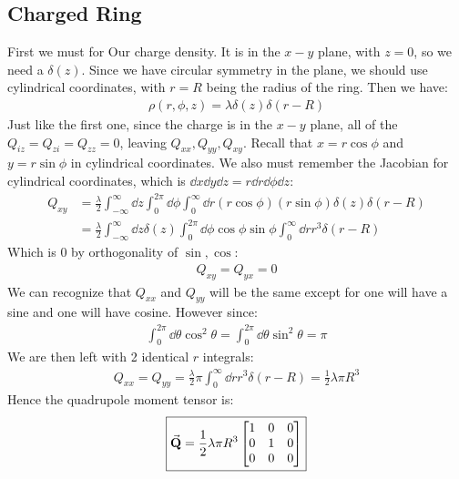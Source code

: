 \documentclass[12pt]{article}
\begin{document}
\subsection{Charged Ring}
First we must for Our charge density. It is in the $x-y$ plane, with $z=0$, so we need a $\delta(z)$. Since we have circular symmetry in the plane, we should use cylindrical coordinates, with $r=R$ being the radius of the ring. Then we have:
\begin{align*}
  \rho(r,\phi,z)=\lambda\delta(z)\delta(r-R)
\end{align*}
Just like the first one, since the charge is in the $x-y$ plane, all of the $Q_{iz}=Q_{zi}=Q_{zz}=0$, leaving $Q_{xx},Q_{yy},Q_{xy}$. Recall that $x=r\cos\phi$ and $y=r\sin\phi$ in cylindrical coordinates. We also must remember the Jacobian for cylindrical coordinates, which is $\dd{x}\dd{y}\dd{z}=r\dd{r}\dd{\phi}\dd{z}$:
\begin{align*}
  Q_{xy}&=\frac\lambda2\int_{-\infty}^\infty\dd{z}
  \int_0^{2\pi}\dd{\phi}\int_0^{\infty}\dd{r}
  (r\cos\phi)(r\sin\phi)\delta(z)\delta(r-R)\\
  &=\frac\lambda2\int_{-\infty}^\infty\dd{z}\delta(z)
  \int_0^{2\pi}\dd{\phi}\cos\phi\sin\phi
  \int_0^\infty\dd{r}r^3\delta(r-R)
\end{align*}
Which is $0$ by orthogonality of $\sin,\cos$:
\begin{align*}
  Q_{xy}=Q_{yx}=0
\end{align*}
We can recognize that $Q_{xx}$ and $Q_{yy}$ will be the same except for one will have a sine and one will have cosine. However since:
\begin{align*}
  \int_0^{2\pi}\dd{\theta}\cos^2\theta=\int_0^{2\pi}\dd{\theta}\sin^2\theta=\pi
\end{align*}
We are then left with 2 identical $r$ integrals:
\begin{align*}
  Q_{xx}=Q_{yy}=\frac\lambda2\pi\int_0^\infty\dd{r}r^3\delta(r-R)=
  \frac12\lambda\pi R^3
\end{align*}
Hence the quadrupole moment tensor is:
\begin{align}
  \boxed{
    \va{\vb{Q}}=\frac12\lambda\pi R^3
    \begin{bmatrix}
      1 & 0 & 0 \\ 0 & 1 & 0 \\ 0 & 0 & 0
    \end{bmatrix}
  }
\end{align}
\end{document}
